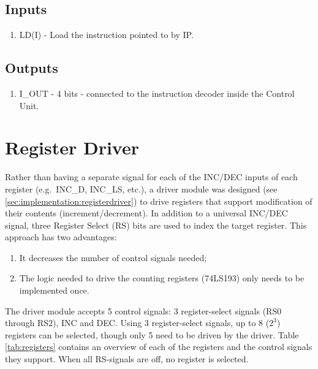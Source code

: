 \subsection*{Inputs}
\begin{enumerate}
\itemsep0em 
\item LD(I) - Load the instruction pointed to by IP.
\end{enumerate}

\subsection*{Outputs}
\begin{enumerate}
\itemsep0em 
\item I\_OUT - 4 bits - connected to the instruction decoder inside the Control Unit.
\end{enumerate}


\section{Register Driver} \label{sec:architecture:registerdriver}
Rather than having a separate signal for each of the INC/DEC inputs of each register (e.g.~INC\_D, INC\_LS, etc.), a driver module was designed (see \ref{sec:implementation:registerdriver}) to drive registers that support modification of their contents (increment/decrement). In addition to a universal INC/DEC signal, three Register Select (RS) bits are used to index the target register. This approach has two advantages:
\begin{enumerate}
\item It decreases the number of control signals needed;
\item The logic needed to drive the counting registers (74LS193) only needs to be implemented once.
\end{enumerate}

The driver module accepts 5 control signals: 3 register-select signals (RS0 through RS2), INC and DEC. Using 3 register-select signals, up to 8 ($2^3$) registers can be selected, though only 5 need to be driven by the driver. Table \ref{tab:registers} contains an overview of each of the registers and the control signals they support. When all RS-signals are off, no register is selected.

